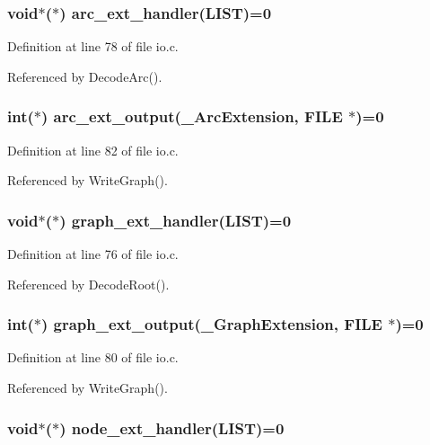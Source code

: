 \subsubsection{\setlength{\rightskip}{0pt plus 5cm}void$\ast$($\ast$) \bf{arc\_\-ext\_\-handler}(\bf{LIST})=0}\label{io_8c_e3a5dee128b8491e952ce97e7cc12440}




Definition at line 78 of file io.c.

Referenced by Decode\-Arc().
\subsubsection{\setlength{\rightskip}{0pt plus 5cm}int($\ast$) \bf{arc\_\-ext\_\-output}(\bf{\_\-Arc\-Extension}, FILE $\ast$)=0}\label{io_8c_e1031754a76274e275ebafce13ef21a5}




Definition at line 82 of file io.c.

Referenced by Write\-Graph().
\subsubsection{\setlength{\rightskip}{0pt plus 5cm}void$\ast$($\ast$) \bf{graph\_\-ext\_\-handler}(\bf{LIST})=0}\label{io_8c_ca3011de46ef368513901982c2040a15}




Definition at line 76 of file io.c.

Referenced by Decode\-Root().
\subsubsection{\setlength{\rightskip}{0pt plus 5cm}int($\ast$) \bf{graph\_\-ext\_\-output}(\bf{\_\-Graph\-Extension}, FILE $\ast$)=0}\label{io_8c_15648e7aba1e67dd4bd839038cf303dd}




Definition at line 80 of file io.c.

Referenced by Write\-Graph().
\subsubsection{\setlength{\rightskip}{0pt plus 5cm}void$\ast$($\ast$) \bf{node\_\-ext\_\-handler}(\bf{LIST})=0}\label{io_8c_c67343d5f9626ac8287bd2247f8e259b}




